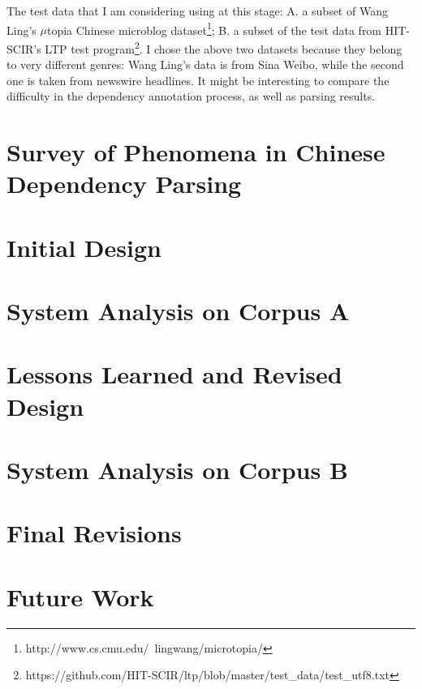 \documentclass[11pt,letterpaper]{article}
\begin{document}
The test data that I am considering using at this stage: A. a subset of Wang Ling's $\mu$topia Chinese microblog dataset\footnote{http://www.cs.cmu.edu/~lingwang/microtopia/}; B. a subset of the test data from HIT-SCIR's LTP test program\footnote{https://github.com/HIT-SCIR/ltp/blob/master/test\_data/test\_utf8.txt}.
I chose the above two datasets because they belong to very different genres:
Wang Ling's data is from Sina Weibo, while the second one is taken from newswire headlines.
It might be interesting to compare the difficulty in the dependency annotation process,
as well as parsing results.

\section{Survey of Phenomena in Chinese Dependency Parsing}

\section{Initial Design}

\section{System Analysis on Corpus A}

\section{Lessons Learned and Revised Design}

\section{System Analysis on Corpus B}

\section{Final Revisions}

\section{Future Work}








\label{lastpage}
\end{document}
